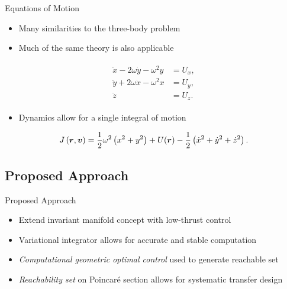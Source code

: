 \documentclass[11pt,professionalfonts]{beamer}
\begin{document}
\begin{frame}{Equations of Motion}

\begin{itemize}
    \item Many similarities to the three-body problem
    \item Much of the same theory is also applicable
\end{itemize}

\begin{align} \label{eq:eoms}
    \begin{split}
        \ddot{x} - 2 \omega \dot{y} - \omega^2 y &= U_x , \\
        \ddot{y} + 2 \omega \dot{x} - \omega^2 x &= U_y , \\
        \ddot{z} &= U_z .
    \end{split}
\end{align}
\pause
\begin{itemize}
    \item Dynamics allow for a single integral of motion
\end{itemize}

\begin{align}\label{eq:jacobi}
    J \left( \bm{r}, \bm{v} \right) = \frac{1}{2} \omega^2 \left( x^2 + y^2 \right) + U(\bm{r}) - \frac{1}{2} \left( \dot{x}^2 + \dot{y}^2 + \dot{z}^2 \right) .
\end{align}

\end{frame}


\subsection*{Proposed Approach}

\begin{frame}{Proposed Approach} %
  \begin{itemize}
      \item Extend invariant manifold concept with low-thrust control  
      \item Variational integrator allows for accurate and stable computation
      \item \emph{Computational geometric optimal control} used to generate reachable set
      \item \emph{Reachability set} on Poincar\'e section allows for systematic transfer design
  \end{itemize}
\end{frame} %
\end{document}
